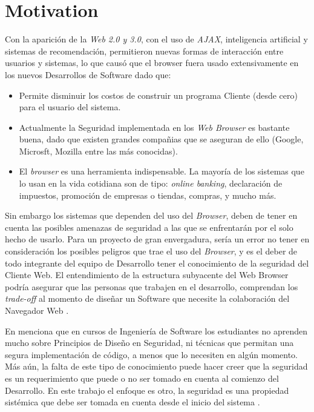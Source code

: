 \section{Motivation}
\label{chap1:motiv}

Con la aparición de la \textit{Web 2.0 y 3.0}, con el uso de \textit{AJAX}, inteligencia artificial y sistemas de recomendación, permitieron nuevas formas de interacción entre usuarios y sistemas, lo que causó que el browser fuera usado extensivamente en los nuevos Desarrollos de Software dado que:
\begin{itemize}
	\item Permite disminuir los costos de construir un programa Cliente (desde cero) para el usuario del sistema.
	\item Actualmente la Seguridad implementada en los \textit{Web Browser} es bastante buena, dado que existen grandes compañias que se aseguran de ello (Google, Microsft, Mozilla entre las más conocidas). 
	\item El \textit{browser} es una herramienta indispensable. La mayoría de los sistemas que lo usan en la vida cotidiana son de tipo: \textit{online banking}, declaración de impuestos, promoción de empresas o tiendas, compras, y mucho más.
\end{itemize}

Sin embargo los sistemas que dependen del uso del \textit{Browser}, deben de tener en cuenta las posibles amenazas de seguridad a las que se enfrentarán por el solo hecho de usarlo. Para un proyecto de gran envergadura, sería un error no tener en consideración los posibles peligros que trae el uso del \textit{Browser}, y es el deber de todo integrante del equipo de Desarrollo tener el conocimiento de la seguridad del Cliente Web. El entendimiento de la estructura subyacente del Web Browser podría asegurar que las personas que trabajen en el desarrollo, comprendan los \textit{trade-off} al momento de diseñar un Software que necesite la colaboración del Navegador Web \cite{535061, 2005-grosskurth-browser-refarch,preprint-grosskurth-browser-archevol}.

En \cite{goertzel2007software} menciona que en cursos de Ingeniería de Software los estudiantes no aprenden mucho sobre Principios de Diseño en Seguridad, ni técnicas que permitan una segura implementación de código, a menos que lo necesiten en algún momento. Más aún, la falta de este tipo de conocimiento puede hacer creer que la seguridad es un requerimiento que puede o no ser tomado en cuenta al comienzo del Desarrollo. En este trabajo el enfoque es otro, la seguridad es una propiedad sistémica que debe ser tomada en cuenta desde el inicio del sistema \cite{fernandez2004methodology, fernandez2006defining, braz2008eliciting, fernandez2013security}.

